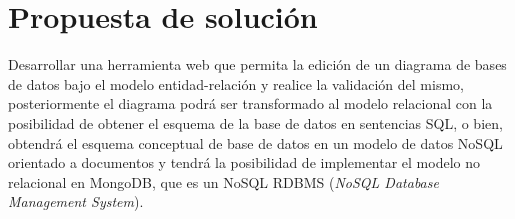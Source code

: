 \section{Propuesta de solución}

Desarrollar una herramienta web que permita la edición de un diagrama de bases de datos bajo el modelo entidad-relación y realice la validación del mismo, posteriormente el diagrama podrá ser transformado al modelo relacional con la posibilidad de obtener el esquema de la base de datos en sentencias SQL, o bien, obtendrá el esquema conceptual de base de datos en un modelo de datos NoSQL orientado a documentos y tendrá la posibilidad de implementar el modelo no relacional en MongoDB, que es un NoSQL RDBMS (\textit{NoSQL Database Management System}).